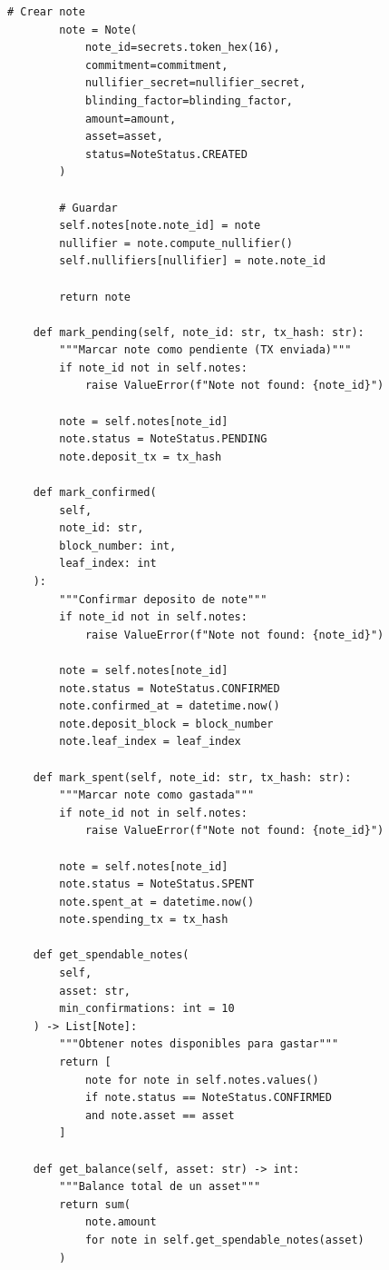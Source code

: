 \documentclass[11pt,a4paper,twoside]{book}
\theoremstyle{definition}
\theoremstyle{remark}
\begin{document}
\begin{lstlisting}[style=python, caption={Sistema completo de gestión de notes}]
        # Crear note
        note = Note(
            note_id=secrets.token_hex(16),
            commitment=commitment,
            nullifier_secret=nullifier_secret,
            blinding_factor=blinding_factor,
            amount=amount,
            asset=asset,
            status=NoteStatus.CREATED
        )
        
        # Guardar
        self.notes[note.note_id] = note
        nullifier = note.compute_nullifier()
        self.nullifiers[nullifier] = note.note_id
        
        return note
    
    def mark_pending(self, note_id: str, tx_hash: str):
        """Marcar note como pendiente (TX enviada)"""
        if note_id not in self.notes:
            raise ValueError(f"Note not found: {note_id}")
        
        note = self.notes[note_id]
        note.status = NoteStatus.PENDING
        note.deposit_tx = tx_hash
    
    def mark_confirmed(
        self,
        note_id: str,
        block_number: int,
        leaf_index: int
    ):
        """Confirmar deposito de note"""
        if note_id not in self.notes:
            raise ValueError(f"Note not found: {note_id}")
        
        note = self.notes[note_id]
        note.status = NoteStatus.CONFIRMED
        note.confirmed_at = datetime.now()
        note.deposit_block = block_number
        note.leaf_index = leaf_index
    
    def mark_spent(self, note_id: str, tx_hash: str):
        """Marcar note como gastada"""
        if note_id not in self.notes:
            raise ValueError(f"Note not found: {note_id}")
        
        note = self.notes[note_id]
        note.status = NoteStatus.SPENT
        note.spent_at = datetime.now()
        note.spending_tx = tx_hash
    
    def get_spendable_notes(
        self,
        asset: str,
        min_confirmations: int = 10
    ) -> List[Note]:
        """Obtener notes disponibles para gastar"""
        return [
            note for note in self.notes.values()
            if note.status == NoteStatus.CONFIRMED
            and note.asset == asset
        ]
    
    def get_balance(self, asset: str) -> int:
        """Balance total de un asset"""
        return sum(
            note.amount
            for note in self.get_spendable_notes(asset)
        )
    

\end{lstlisting}
\end{document}
